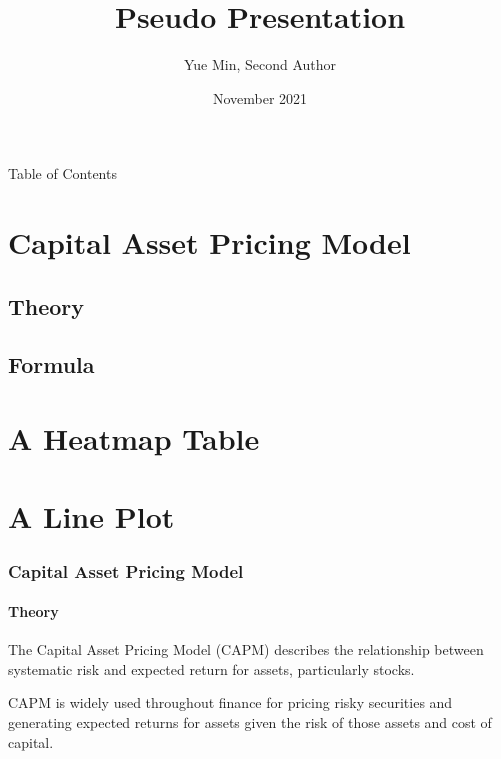 \documentclass[10pt]{beamer}
\title{Pseudo Presentation}
\author{Yue Min, Second Author}
\institute{University of Zurich, Second Affiliation}
\date{November 2021}
\begin{document}
\frame{\titlepage}

\begin{frame}{Table of Contents}
    \tableofcontents
\end{frame}

\section{Capital Asset Pricing Model}
    \subsection{Theory}
    \subsection{Formula}
\section{A Heatmap Table}
\section{A Line Plot}

\begin{frame}
    \frametitle{Capital Asset Pricing Model}
    \framesubtitle{Theory}
    \begin{theorem}
        The Capital Asset Pricing Model (CAPM) describes the relationship between systematic risk and expected return for assets, particularly stocks. \\
        
    \end{theorem}
    
    \vspace{5mm}
    
    CAPM is widely used throughout finance for pricing risky securities and generating expected returns for assets given the risk of those assets and cost of capital.

    \end{frame}
\end{document}
